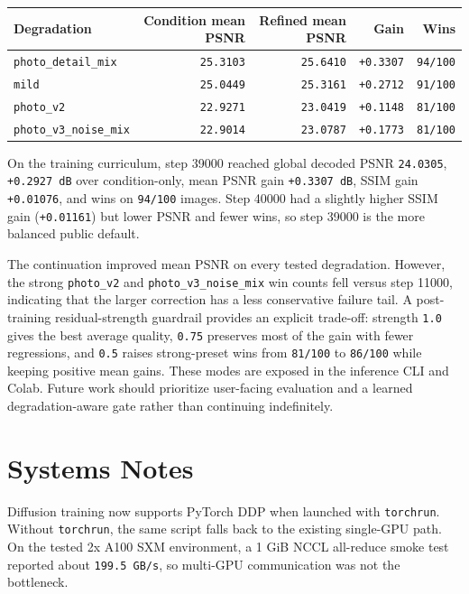 \documentclass[
  10pt,
]{article}
\begin{document}
\begin{longtable}[]{@{}lrrrr@{}}
\toprule\noalign{}
Degradation & Condition mean PSNR & Refined mean PSNR & Gain & Wins \\
\midrule\noalign{}
\endhead
\bottomrule\noalign{}
\endlastfoot
\texttt{photo\_detail\_mix} & \texttt{25.3103} & \texttt{25.6410} &
\texttt{+0.3307} & \texttt{94/100} \\
\texttt{mild} & \texttt{25.0449} & \texttt{25.3161} & \texttt{+0.2712} &
\texttt{91/100} \\
\texttt{photo\_v2} & \texttt{22.9271} & \texttt{23.0419} &
\texttt{+0.1148} & \texttt{81/100} \\
\texttt{photo\_v3\_noise\_mix} & \texttt{22.9014} & \texttt{23.0787} &
\texttt{+0.1773} & \texttt{81/100} \\
\end{longtable}

On the training curriculum, step 39000 reached global decoded PSNR
\texttt{24.0305}, \texttt{+0.2927\ dB} over condition-only, mean PSNR
gain \texttt{+0.3307\ dB}, SSIM gain \texttt{+0.01076}, and wins on
\texttt{94/100} images. Step 40000 had a slightly higher SSIM gain
(\texttt{+0.01161}) but lower PSNR and fewer wins, so step 39000 is the
more balanced public default.

The continuation improved mean PSNR on every tested degradation.
However, the strong \texttt{photo\_v2} and
\texttt{photo\_v3\_noise\_mix} win counts fell versus step 11000,
indicating that the larger correction has a less conservative failure
tail. A post-training residual-strength guardrail provides an explicit
trade-off: strength \texttt{1.0} gives the best average quality,
\texttt{0.75} preserves most of the gain with fewer regressions, and
\texttt{0.5} raises strong-preset wins from \texttt{81/100} to
\texttt{86/100} while keeping positive mean gains. These modes are
exposed in the inference CLI and Colab. Future work should prioritize
user-facing evaluation and a learned degradation-aware gate rather than
continuing indefinitely.

\hypertarget{systems-notes}{%
\section{Systems Notes}\label{systems-notes}}

Diffusion training now supports PyTorch DDP when launched with
\texttt{torchrun}. Without \texttt{torchrun}, the same script falls back
to the existing single-GPU path. On the tested 2x A100 SXM environment,
a 1 GiB NCCL all-reduce smoke test reported about \texttt{199.5\ GB/s},
so multi-GPU communication was not the bottleneck.
\end{document}
